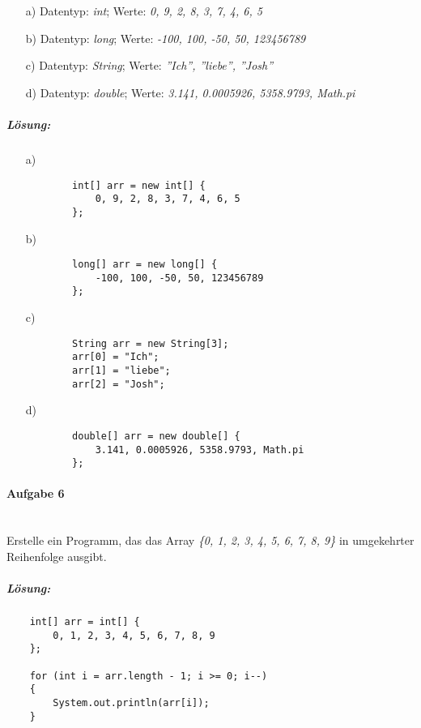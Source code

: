\documentclass[12pt,a4paper,ngerman]{scrartcl}
\begin{document}
	\begin{itemize}
		\item[a)] Datentyp: \emph{int}; Werte: \emph{0, 9, 2, 8, 3, 7, 4, 6, 5}
		\item[b)] Datentyp: \emph{long}; Werte: \emph{-100, 100, -50, 50, 123456789}
		\item[c)] Datentyp: \emph{String}; Werte: \emph{''Ich'', ''liebe'', ''Josh''}
		\item[d)] Datentyp: \emph{double}; Werte: \emph{3.141, 0.0005926, 5358.9793, Math.pi}
	\end{itemize}
	
	\subparagraph{Lösung:}
	\begin{itemize}
		\item[a)] \begin{lstlisting}
		int[] arr = new int[] {
			0, 9, 2, 8, 3, 7, 4, 6, 5
		};
		\end{lstlisting}
		
		\item[b)] \begin{lstlisting}
		long[] arr = new long[] {
			-100, 100, -50, 50, 123456789
		};
		\end{lstlisting}
		
		\item[c)] \begin{lstlisting}
		String arr = new String[3];
		arr[0] = "Ich";
		arr[1] = "liebe";
		arr[2] = "Josh";
		\end{lstlisting}
		
		\item[d)] \begin{lstlisting}
		double[] arr = new double[] {
			3.141, 0.0005926, 5358.9793, Math.pi
		};
		\end{lstlisting}
	\end{itemize}
	
	\paragraph{Aufgabe 6}\mbox{}\\
	Erstelle ein Programm, das das Array \emph{\{0, 1, 2, 3, 4, 5, 6, 7, 8, 9\}} in umgekehrter Reihenfolge ausgibt.
	
	\subparagraph{Lösung:}\mbox{}
	\begin{lstlisting}
	int[] arr = int[] {
		0, 1, 2, 3, 4, 5, 6, 7, 8, 9
	};
	
	for (int i = arr.length - 1; i >= 0; i--)
	{
		System.out.println(arr[i]);
	}
	\end{lstlisting}
	
\end{document}
